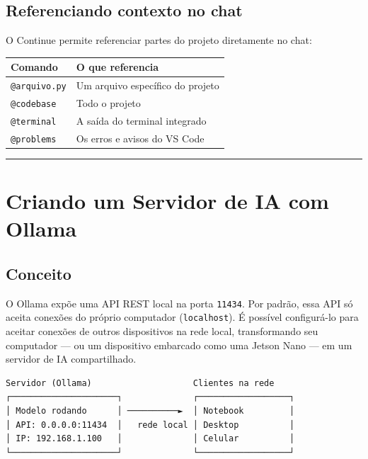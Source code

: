 \documentclass[
]{article}
\begin{document}
\subsection{Referenciando contexto no
chat}\label{referenciando-contexto-no-chat}

O Continue permite referenciar partes do projeto diretamente no chat:

\begin{longtable}[]{@{}ll@{}}
\toprule\noalign{}
Comando & O que referencia \\
\midrule\noalign{}
\endhead
\bottomrule\noalign{}
\endlastfoot
\texttt{@arquivo.py} & Um arquivo específico do projeto \\
\texttt{@codebase} & Todo o projeto \\
\texttt{@terminal} & A saída do terminal integrado \\
\texttt{@problems} & Os erros e avisos do VS Code \\
\end{longtable}

\begin{center}\rule{0.5\linewidth}{0.5pt}\end{center}

\section{Criando um Servidor de IA com
Ollama}\label{criando-um-servidor-de-ia-com-ollama}

\subsection{Conceito}\label{conceito}

O Ollama expõe uma API REST local na porta \texttt{11434}. Por padrão,
essa API só aceita conexões do próprio computador (\texttt{localhost}).
É possível configurá-lo para aceitar conexões de outros dispositivos na
rede local, transformando seu computador --- ou um dispositivo embarcado
como uma Jetson Nano --- em um servidor de IA compartilhado.

\begin{verbatim}
Servidor (Ollama)                    Clientes na rede
┌─────────────────────┐              ┌──────────────────┐
│ Modelo rodando      │ ──────────►  │ Notebook         │
│ API: 0.0.0.0:11434  │   rede local │ Desktop          │
│ IP: 192.168.1.100   │              │ Celular          │
└─────────────────────┘              └──────────────────┘
\end{verbatim}
\end{document}
